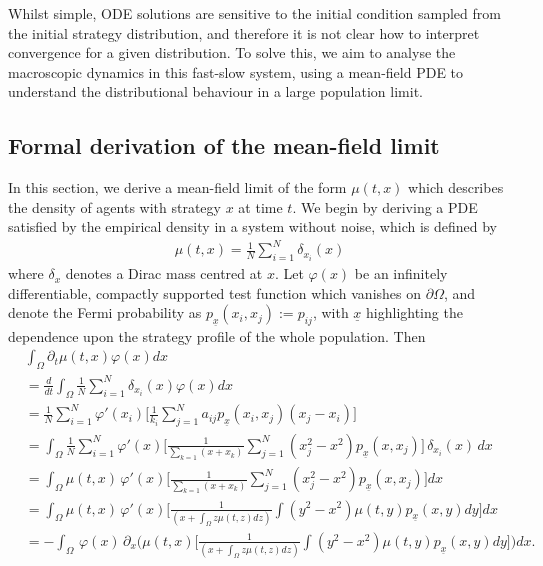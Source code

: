 \documentclass[10pt]{article}
\begin{document}
Whilst simple, ODE solutions are sensitive to the initial condition sampled from the initial strategy distribution, and therefore it is not clear how to interpret convergence for a given distribution. To solve this, we aim to analyse the macroscopic dynamics in this fast-slow system, using a mean-field PDE to understand the distributional behaviour in a large population limit.


\subsection{Formal derivation of the mean-field limit}
In this section, we derive a mean-field limit of the form $\mu(t,x)$ which describes the density of agents with strategy $x$ at time $t$.  We begin by deriving a PDE satisfied by the empirical density \cite{jabin_meanfieldlimit_2017} in a system without noise, which is defined by
\begin{align}\label{eqn: empirical measure}
    \mu(t,x) = \frac{1}{N}\sum_{i=1}^N \delta_{x_i}(x)
\end{align}
where $\delta_x$ denotes a Dirac mass centred at $x$. Let $\varphi(x)$ be an infinitely differentiable, compactly supported test function which vanishes on $\partial\Omega$, and denote the Fermi probability as $p_{\underline{x}}(x_i,x_j) := p_{ij}$, with $\underline{x}$ highlighting the dependence upon the strategy profile of the whole population. Then
\begin{align*}
    &\int_\Omega \partial_t\mu(t,x)\varphi(x)dx\\ &= \frac{d}{dt}\int_\Omega\frac{1}{N}\sum_{i=1}^N \delta_{x_i}(x) \varphi(x)dx\\
    &=\frac{1}{N} \sum_{i=1}^N \varphi'(x_i) \Bigg[\frac{1}{ k_i}\sum_{j=1}^N a_{ij}p_{\underline{x}}(x_i,x_j)(x_j-x_i)\Bigg]\\
    &=\int_\Omega\frac{1}{N} \sum_{i=1}^N \varphi'(x) \Bigg[\frac{1}{ \sum_{k=1}(x+x_k)}\sum_{j=1}^N (x_j^2-x^2)p_{\underline{x}}(x,x_j) \Bigg] \,\delta_{x_i}(x) \, dx\\
    &=\int_\Omega\mu(t,x) \,\varphi'(x) \Bigg[\frac{1}{\sum_{k=1}(x+x_k)}\sum_{j=1}^N (x_j^2-x^2)p_{\underline{x}}(x,x_j)\Bigg] dx\\
    &=\int_\Omega\mu(t,x) \,\varphi'(x) \Bigg[ \frac{1}{ (x+\int_\Omega z\mu(t,z)dz)} \int(y^2-x^2)\mu(t,y)p_{\underline{x}}(x,y)dy\Bigg] dx\\
    &=-\int_\Omega \,\varphi(x) \, \partial_x \Bigg( \mu(t,x)\Bigg[ \frac{1}{(x+\int_\Omega z\mu(t,z)dz)} \int(y^2-x^2)\mu(t,y)p_{\underline{x}}(x,y)dy\Bigg] \Bigg) dx.
\end{align*}
\end{document}
